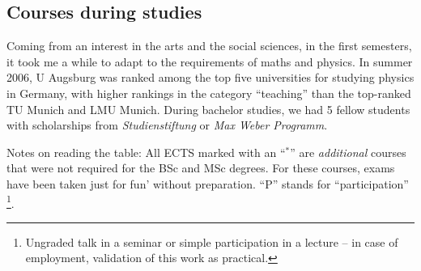 
\renewcommand{\widthA}{0.7\textwidth}
\renewcommand{\widthB}{0.13\textwidth}
\renewcommand{\widthC}{0.1\textwidth}


%

\hypertarget{courses}{}
\subsection*{Courses during studies}
Coming from an interest in the arts and the social sciences, in the first semesters, it took me a while to adapt to the requirements of maths and physics. In summer 2006, U Augsburg was ranked among the top five universities for studying physics in Germany, with higher rankings in the category ``teaching'' than the top-ranked TU Munich and LMU Munich. During bachelor studies, we had 5 fellow students with scholarships from \textit{Studienstiftung} or \textit{Max Weber Programm}.

Notes on reading the table:
All ECTS marked with an ``$^*$'' are \textit{additional} courses that were not required for the BSc and MSc degrees. For these courses, exams have been taken just for fun' without preparation. 
``P'' stands for ``participation''%
\footnote[3]
{
Ungraded talk in a seminar or simple participation in a lecture -- in case of employment, validation of this work as practical.
}. 

